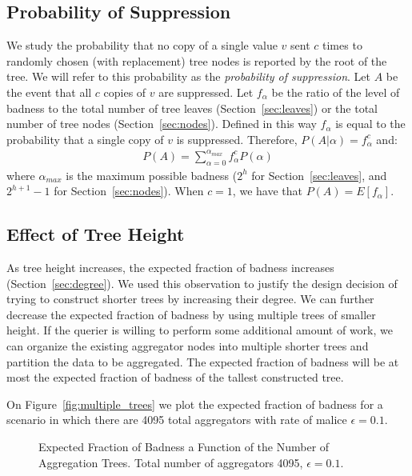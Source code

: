 \documentclass[11pt,twocolumn]{MyTightStyle}
\theoremstyle{plain}
\theoremstyle{definition}
\theoremstyle{remark}
\numberwithin{equation}{section}
\begin{document}
  \subsection{Probability of Suppression}
  \label{sec:supress}
  We study the probability that no copy of a single value $v$ sent $c$ times to
  randomly chosen (with replacement) tree nodes is reported by the
  root of the tree. We will refer to this probability as the
  \emph{probability of suppression}. Let $A$ be the event that all $c$
  copies of $v$ are suppressed. Let $f_\alpha$ be the ratio of the
  level of badness to the total number of tree leaves
  (Section~\ref{sec:leaves}) or the total number of tree nodes
  (Section~\ref{sec:nodes}). Defined in this way $f_\alpha$ is equal
  to the probability that a single copy of $v$ is
  suppressed. Therefore, $P(A|\alpha)=f_{\alpha}^c$ and:
  \begin{eqnarray}
    P(A) = \sum_{\alpha=0}^{\alpha_{max}}f_{\alpha}^cP(\alpha)
  \end{eqnarray}
  where $\alpha_{max}$ is the maximum possible badness ($2^h$ for
  Section~\ref{sec:leaves}, and $2^{h+1}-1$ for Section~\ref{sec:nodes}).
  When $c=1$, we have that $P(A)=E[f_{\alpha}]$.

  \subsection{Effect of Tree Height}
  \label{sec:height}
  As tree height increases, the expected fraction of badness
  increases (Section~\ref{sec:degree}). We used this observation to
  justify the design decision of trying to construct shorter trees by
  increasing their degree. We can further decrease the expected
  fraction of badness by using multiple trees of smaller height. If
  the querier is willing to perform some additional amount of work, we
  can organize the existing aggregator nodes into multiple shorter
  trees and partition the data to be aggregated. The expected fraction
  of badness will be at most the expected fraction of badness of the
  tallest constructed tree.

  On Figure~\ref{fig:multiple_trees} we plot the expected fraction of
  badness for a scenario in which there are 4095 total aggregators
  with rate of malice $\epsilon=0.1$. 

  \begin{figure}[htpb!]
    \begin{center}
      \caption{\label{sec:multiple_trees} Expected Fraction of Badness
      a Function of the Number of Aggregation Trees. Total number of
      aggregators 4095, $\epsilon=0.1$.}
    \end{center}
  \end{figure}
\end{document}
